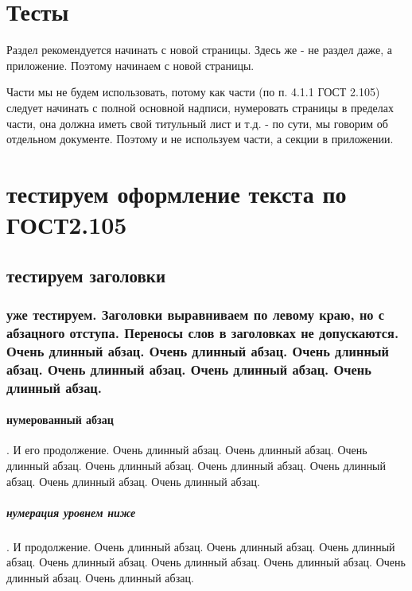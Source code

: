 
\let\le\leqslant
\let\ge\geqslant
\let\tan\tg
\let\arctan\arctg
\let\cot\ctg
\let\arccot\arcctg
\let\times\cdot

\makeatletter

	\appendix
	\section{Тесты}
	
	Раздел рекомендуется начинать с новой страницы. Здесь же - не раздел даже, а приложение.
	Поэтому начинаем с новой страницы.
	
	Части мы не будем использовать, потому как части (по п. 4.1.1 ГОСТ 2.105) следует
	начинать с полной основной надписи, нумеровать страницы в пределах части,
	она должна иметь свой титульный лист и т.д. - по сути, мы говорим об отдельном документе.
	Поэтому и не используем части, а секции в приложении.

	\section{тестируем оформление текста по ГОСТ2.105}
	\subsection{тестируем заголовки}
	\subsubsection{уже тестируем.
		Заголовки выравниваем по левому краю, но с абзацного отступа.
		Переносы слов в заголовках не допускаются.
		Очень длинный абзац. Очень длинный абзац.
		Очень длинный абзац. Очень длинный абзац. Очень длинный абзац. Очень длинный абзац.}
	
	\paragraph{нумерованный абзац}. И его продолжение.
	Очень длинный абзац. Очень длинный абзац. Очень длинный абзац. Очень длинный абзац.
	Очень длинный абзац. Очень длинный абзац. Очень длинный абзац. Очень длинный абзац.
		
	\subparagraph{нумерация уровнем ниже}. И продолжение.
	Очень длинный абзац. Очень длинный абзац. Очень длинный абзац. Очень длинный абзац.
	Очень длинный абзац. Очень длинный абзац. Очень длинный абзац. Очень длинный абзац.
		
